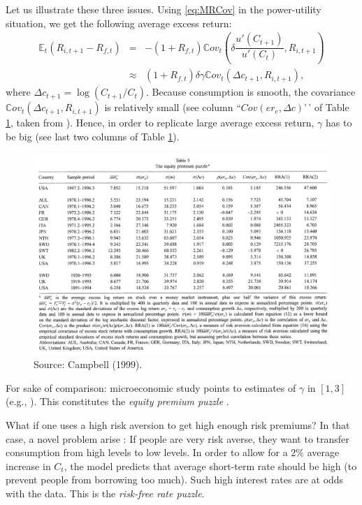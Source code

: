\documentclass[
  12pt,
]{book}
\theoremstyle{definition}
\theoremstyle{definition}
\theoremstyle{definition}
\theoremstyle{definition}
\theoremstyle{remark}
\begin{document}
Let us illustrate these three issues. Using \eqref{eq:MRCov} in the power-utility situation, we get the following average excess return:
\begin{eqnarray*}
\mathbb{E}_t(R_{i,t+1} - R_{f,t}) &=& - (1 + R_{f,t}) \mathbb{C}ov_t\left(\delta \dfrac{u'(C_{t+1})}{u'(C_{t})},R_{i,t+1}\right)\\
&\approx& (1 + R_{f,t}) \delta \gamma  \mathbb{C}ov_t\left(\Delta c_{t+1},R_{i,t+1}\right),
\end{eqnarray*}
where \(\Delta c_{t+1} = \log(C_{t+1}/C_t)\).
Because consumption is smooth, the covariance \(\mathbb{C}ov_t\left(\Delta c_{t+1},R_{i,t+1}\right)\) is relatively small (see column ``\(Cov(er_e,\Delta c)\)'\,' of Table \ref{fig:Campbell1}, taken from \citet{Campbell_1999}).
Hence, in order to replicate large average excess return, \(\gamma\) has to be big (see last two columns of Table \ref{fig:Campbell1}).

\begin{figure}

{\centering \includegraphics[width=1\linewidth]{figures/table_campbell1999_eqpuzzle} 

}

\caption{Source: Campbell (1999).}\label{fig:Campbell1}
\end{figure}

For sake of comparison: microeconomic study points to estimates of \(\gamma\) in \([1,3]\) (e.g., \citet{Hartley_Lanot_Walker_2014}). This constitutes the \emph{equity premium puzzle} \citep{Mehra_Prescott_1985}.

What if one uses a high risk aversion to get high enough risk premiums? In that case, a novel problem arise \citep{Kandel_Stambaugh_1991}: If people are very risk averse, they want to transfer consumption from high levels to low levels.
In order to allow for a 2\% average increase in \(C_t\), the model predicts that average short-term rate should be high (to prevent people from borrowing too much). Such high interest rates are at odds with the data. This is the \emph{risk-free rate puzzle}.
\end{document}
